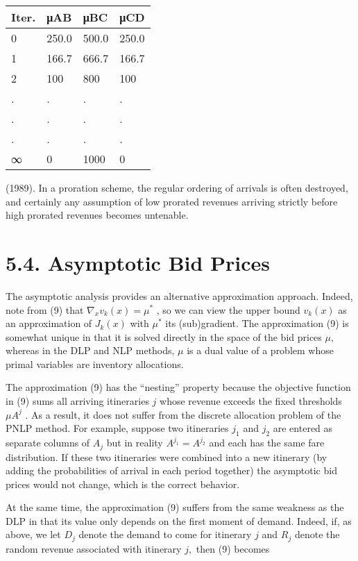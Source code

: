 \begin{longtable}[]{@{}|l|l|l|l|@{}}
\toprule\noalign{}
\endhead
\bottomrule\noalign{}
\endlastfoot
\hline
Iter. & μAB & μBC & μCD \\
\hline
0 & 250.0 & 500.0 & 250.0 \\
\hline
1 & 166.7 & 666.7 & 166.7 \\
\hline
2 & 100 & 800 & 100 \\
\hline
. & . & . & . \\
\hline
. & . & . & . \\
\hline
. & . & . & . \\
\hline
∞ & 0 & 1000 & 0 \\
\hline
\end{longtable}

(1989). In a proration scheme, the regular ordering of arrivals is often
destroyed, and certainly any assumption of low prorated revenues
arriving strictly before high prorated revenues becomes untenable.

\section{5.4. Asymptotic Bid Prices}\label{asymptotic-bid-prices}

The asymptotic analysis provides an alternative approximation approach.
Indeed, note from (9) that \(\nabla_{x}v_{k}(x) = \mu^{*}\) , so we can
view the upper bound \(v_{k}(x)\) as an approximation of \(J_{k}(x)\)
with \(\mu^{*}\) its (sub)gradient. The approximation (9) is somewhat
unique in that it is solved directly in the space of the bid prices
\(\mu ,\) whereas in the DLP and NLP methods, \(\mu\) is a dual value of
a problem whose primal variables are inventory allocations.

The approximation (9) has the ``nesting'' property because the objective
function in (9) sums all arriving itineraries \(j\) whose revenue
exceeds the fixed thresholds \(\mu A^{j}\) . As a result, it does not
suffer from the discrete allocation problem of the PNLP method. For
example, suppose two itineraries \(j_{1}\) and \(j_{2}\) are entered as
separate columns of \(A_{j}\) but in reality \(A^{j_{1}} = A^{j_{2}}\)
and each has the same fare distribution. If these two itineraries were
combined into a new itinerary (by adding the probabilities of arrival in
each period together) the asymptotic bid prices would not change, which
is the correct behavior.

At the same time, the approximation (9) suffers from the same weakness
as the DLP in that its value only depends on the first moment of demand.
Indeed, if, as above, we let \(D_{j}\) denote the demand to come for
itinerary \(j\) and \(R_{j}\) denote the random revenue associated with
itinerary \(j,\) then (9) becomes

